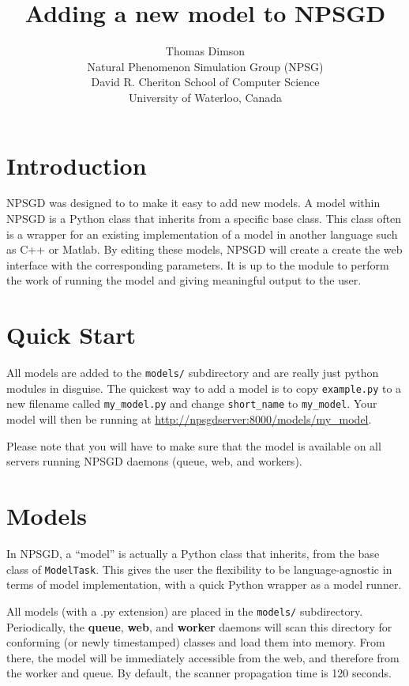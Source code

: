 \documentclass{article}
\title{Adding a new model to NPSGD}
\author{Thomas Dimson\\Natural Phenomenon Simulation Group (NPSG)\\David R. Cheriton School of Computer Science\\University of Waterloo, Canada}
\newcommand{\mpath}[1]{\texttt{#1}}
\newcommand{\mclass}[1]{\texttt{#1}}
\begin{document}
\maketitle
\tableofcontents
\newpage

\section{Introduction}
NPSGD was designed to to make it easy to add new models. A model within NPSGD is
a Python class that inherits from a specific
base class. This class often is a wrapper for an existing implementation of a
model in another language such as C++ or Matlab. By editing these models, NPSGD
will create a create the web interface with the corresponding parameters. It is up to the
module to perform the work of running the model and giving meaningful output to
the user.

\section{Quick Start}
All models are added to the \mpath{models/} subdirectory and are really just python
modules in disguise. The quickest way to add a model is to copy \mpath{example.py} to a
new filename called \mpath{my\_model.py} and change \mpath{short\_name} to
\mpath{my\_model}. Your model will then be running at \url{http://npsgdserver:8000/models/my_model}.

Please note that you will have to make sure that the model is available on all
servers running NPSGD daemons (queue, web, and workers).

\section{Models}
In NPSGD, a ``model'' is actually a Python class that inherits, 
from the base class of \mclass{ModelTask}. This gives the user the
flexibility to be language-agnostic in terms of model implementation, with a
quick Python wrapper as a model runner.

All models (with a .py extension) are placed in the \mpath{models/} subdirectory.
Periodically, the \textbf{queue}, \textbf{web},
and \textbf{worker} daemons will scan this directory for conforming (or newly
timestamped) classes and load them into memory. From there, the model will be
immediately accessible from the web, and therefore from the worker and queue. By
default, the scanner propagation time is 120 seconds.
\end{document}
